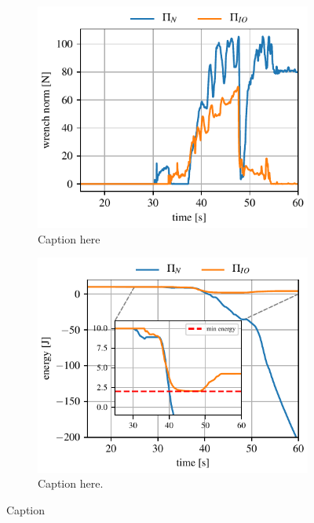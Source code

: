 \begin{figure}[t]
\centering
\hspace*{-0.0cm} 
\begin{subfigure}{\columnwidth}
    \includegraphics[width=\linewidth]{figures/hardware_experiments/wrench_norm.pdf}
    \caption{Caption here}
\end{subfigure}
\hspace*{-0.0cm} 
\begin{subfigure}{\columnwidth}
    \includegraphics[width=\linewidth]{figures/hardware_experiments/tank_energy.pdf}
    \caption{Caption here.}
\end{subfigure}
    \caption{Caption}
    \label{fig:constraint_experiment}
\end{figure}

